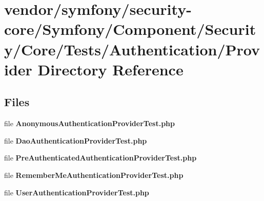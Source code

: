 \section{vendor/symfony/security-\/core/\+Symfony/\+Component/\+Security/\+Core/\+Tests/\+Authentication/\+Provider Directory Reference}
\label{dir_06c293e4799f068c4ec9480ebfa85341}
\subsection*{Files}
\begin{DoxyCompactItemize}
\item 
file {\bf Anonymous\+Authentication\+Provider\+Test.\+php}
\item 
file {\bf Dao\+Authentication\+Provider\+Test.\+php}
\item 
file {\bf Pre\+Authenticated\+Authentication\+Provider\+Test.\+php}
\item 
file {\bf Remember\+Me\+Authentication\+Provider\+Test.\+php}
\item 
file {\bf User\+Authentication\+Provider\+Test.\+php}
\end{DoxyCompactItemize}
